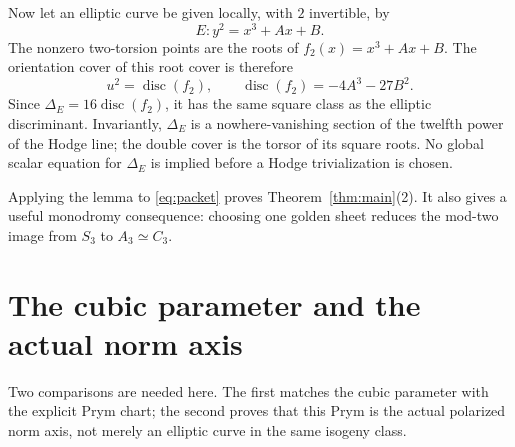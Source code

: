 \documentclass[11pt]{article}
\numberwithin{equation}{section}
\theoremstyle{definition}
\theoremstyle{remark}
\newcommand{\disc}{\operatorname{disc}}
\begin{document}
Now let an elliptic curve be given locally, with \(2\) invertible, by
\[
 E:y^2=x^3+Ax+B.
\]
The nonzero two-torsion points are the roots of
\(f_2(x)=x^3+Ax+B\).  The orientation cover of this root cover is therefore
\[
 u^2=\disc(f_2),
 \qquad
 \disc(f_2)=-4A^3-27B^2.
\]
Since \(\Delta_E=16\disc(f_2)\), it has the same square class as the elliptic
discriminant.  Invariantly, \(\Delta_E\) is a nowhere-vanishing section of
the twelfth power of the Hodge line; the double cover is the torsor of its
square roots.  No global scalar equation for \(\Delta_E\) is implied before
a Hodge trivialization is chosen.

Applying the lemma to \eqref{eq:packet} proves Theorem~\ref{thm:main}(2).
It also gives a useful monodromy consequence: choosing one golden sheet
reduces the mod-two image from \(S_3\) to
\(A_3\simeq C_3\).

\section{The cubic parameter and the actual norm axis}

Two comparisons are needed here.  The first matches the cubic parameter with
the explicit Prym chart; the second proves that this Prym is the actual
polarized norm axis, not merely an elliptic curve in the same isogeny class.
\end{document}
